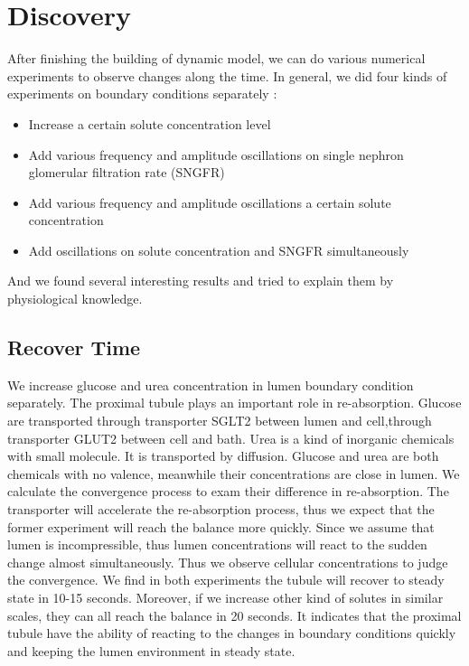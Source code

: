 \documentclass{article}
\begin{document}
\section{Discovery}
After finishing the building of dynamic model, we can do various numerical experiments to observe changes along the time. In general, we did four kinds of experiments on boundary conditions separately :
\begin{itemize}
	\item Increase a certain solute concentration level
	\item Add various frequency and amplitude oscillations on single nephron glomerular filtration rate (SNGFR) 
	\item Add various frequency and amplitude oscillations a certain solute concentration
	\item Add oscillations on solute concentration and SNGFR simultaneously
\end{itemize}
And we found several interesting results and tried to explain them by physiological knowledge.

\subsection{Recover Time}
We increase glucose and urea concentration in lumen boundary condition separately. The proximal tubule plays an important role in re-absorption. Glucose are transported through transporter SGLT2 between lumen and cell,through transporter GLUT2 between cell and bath. Urea is a kind of inorganic chemicals with small molecule. It is transported by diffusion. Glucose and urea are both chemicals with no valence, meanwhile their concentrations are close in lumen. We calculate the convergence process to exam their difference in re-absorption. The transporter will accelerate the re-absorption process, thus we expect that the former experiment will reach the balance more quickly. Since we assume that lumen is incompressible, thus lumen concentrations will react to the sudden change almost simultaneously. Thus we observe cellular concentrations to judge the convergence. We find in both experiments the tubule will recover to steady state in 10-15 seconds. Moreover, if we increase other kind of solutes in similar scales, they can all reach the balance in 20 seconds. It indicates that the proximal tubule have the ability of reacting to the changes in boundary conditions quickly and keeping the lumen environment in steady state.
\end{document}
